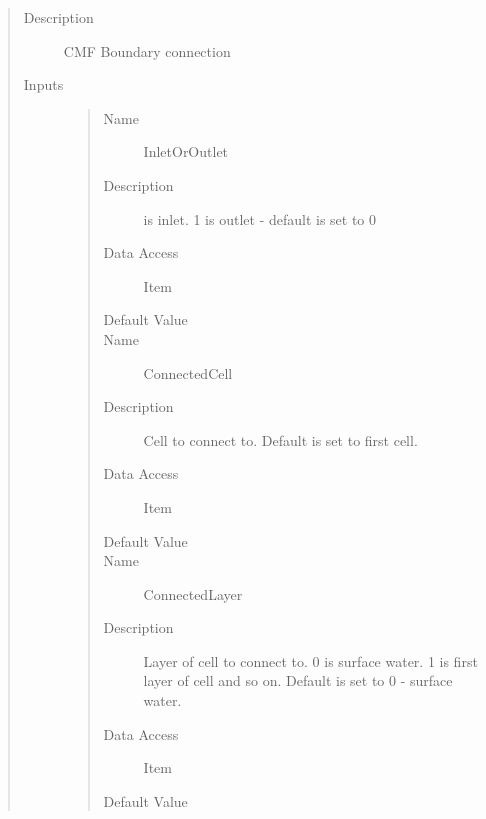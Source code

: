 \documentclass[letterpaper,10pt,english]{sphinxmanual}
\begin{document}
\begin{quote}\begin{description}
\item[{Description}] \leavevmode
CMF Boundary connection

\item[{Inputs}] \leavevmode\begin{quote}\begin{description}
\item[{Name}] \leavevmode
InletOrOutlet

\item[{Description}]  is inlet. 1 is outlet - default is set to 0

\item[{Data Access}] \leavevmode
Item

\item[{Default Value}] \leavevmode
{}

\item[{Name}] \leavevmode
ConnectedCell

\item[{Description}] \leavevmode
Cell to connect to. Default is set to first cell.

\item[{Data Access}] \leavevmode
Item

\item[{Default Value}] \leavevmode
{}

\item[{Name}] \leavevmode
ConnectedLayer

\item[{Description}] \leavevmode
Layer of cell to connect to. 0 is surface water. 1 is first layer of cell and so on.
Default is set to 0 - surface water.

\item[{Data Access}] \leavevmode
Item

\item[{Default Value}] \leavevmode
{}


\end{description}
\end{quote}
\end{description}
\end{quote}
\end{document}
